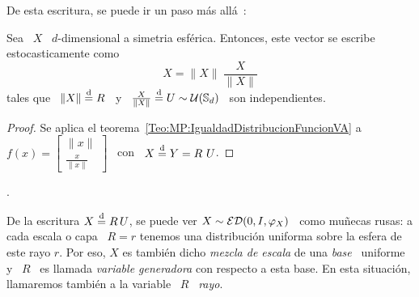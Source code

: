 De esta escritura, se puede ir un paso m\'as all\'a~\cite[Teo~2.3]{FanKot90}:
%
\begin{corolario}\label{Cor:MP:MezclaUniforme}
  Sea  \ $X$ \  $d$-dimensional a  simetria esf\'erica.  Entonces, este  vector se
  escribe estocasticamente como
  \[
  X =  \|X\| \: \frac{X}{\|X\|}
  \]
  tales  que  \ $\|  X  \|  \stackrel{\mathrm{d}}{=}  R$ \  y  \  $\frac{X}{\|X\|} \stackrel{\mathrm{d}}{=}  U  \sim
  \mathcal{U}(\mathbb{S}_d)$ \ son independientes.
\end{corolario}
%
\begin{proof}
  Se  aplica  el  teorema~\ref{Teo:MP:IgualdadDistribucionFuncionVA} a  \  $f(x)
  = \begin{bmatrix} \|x\|\\ \frac{x}{\|x\|} \end{bmatrix}$ \ con \ $X \stackrel{\mathrm{d}}{=} Y =
  R \ U$.
\end{proof}.

De la escritura  $X \stackrel{\mathrm{d}}{=} R \,  U$, se puede ver $X  \sim \mathcal{ED}(0,I,\varphi_X)$ \
como mu\~necas rusas: a cada escala o  capa \ $R = r$ tenemos una distribuci\'on
uniforma sobre la esfera de este rayo  $r$. Por eso, $X$ es tambi\'en dicho {\em
  mezcla de  escala} de  una {\em base}  \ uniforme  y \ $R$  \ es  llamada {\em
  variable generadora} con respecto a  esta base. En esta situaci\'on, llamaremos
tambi\'en a la variable \ $R$ \ {\em rayo}.

